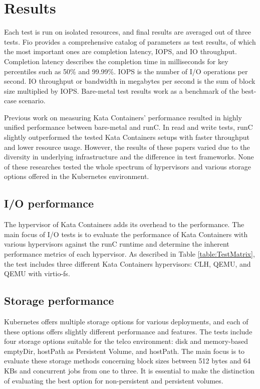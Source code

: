 \section{Results}

Each test is run on isolated resources, and final results are averaged out of three tests. Fio provides a comprehensive catalog of parameters as test results, of which the most important ones are completion latency, IOPS, and IO throughput. Completion latency describes the completion time in milliseconds for key percentiles such as 50\% and 99.99\%. IOPS is the number of I/O operations per second. IO throughput or bandwidth in megabytes per second is the sum of block size multiplied by IOPS. Bare-metal test results work as a benchmark of the best-case scenario.

Previous work \cite{EverartsdeVelp2020}\cite{Kumar2020}\cite{StackHPCKata}\cite{Randazzo2019} on measuring Kata Containers' performance resulted in highly unified performance between bare-metal and runC. In read and write tests, runC slightly outperformed the tested Kata Containers setups with faster throughput and lower resource usage. However, the results of these papers varied due to the diversity in underlying infrastructure and the difference in test frameworks. None of these researches tested the whole spectrum of hypervisors and various storage options offered in the Kubernetes environment.

\subsection{I/O performance}

The hypervisor of Kata Containers adds its overhead to the performance. The main focus of I/O tests is to evaluate the performance of Kata Containers with various hypervisors against the runC runtime and determine the inherent performance metrics of each hypervisor. As described in Table \ref{table:TestMatrix}, the test includes three different Kata Containers hypervisors: CLH, QEMU, and QEMU with virtio-fs.

\subsection{Storage performance}

Kubernetes offers multiple storage options for various deployments, and each of these options offers slightly different performance and features. The tests include four storage options suitable for the telco environment: disk and memory-based emptyDir, hostPath as Persistent Volume, and hostPath. The main focus is to evaluate these storage methods concerning block sizes between 512 bytes and 64 KBs and concurrent jobs from one to three. It is essential to make the distinction of evaluating the best option for non-persistent and persistent volumes.

